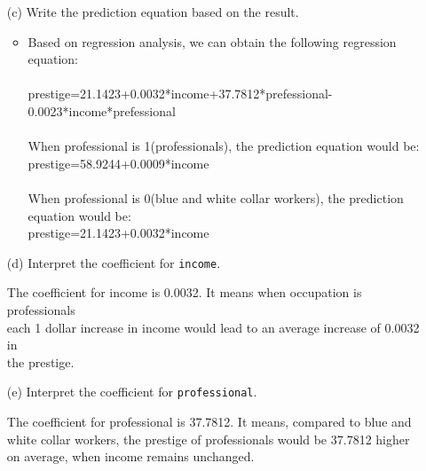 \documentclass[12pt,letterpaper]{article}
\begin{document}
\begin{enumerate}
	\vspace{6cm}
	\item [(c)]
	Write the prediction equation based on the result.
	\vspace{2cm}
			\begin{itemize}
		\item Based on regression analysis, we can obtain the following regression equation:\\
\\
prestige=21.1423+0.0032*income+37.7812*prefessional-0.0023*income*prefessional\\
\\
When professional is 1(professionals), the prediction equation would be:\\
prestige=58.9244+0.0009*income\\
\\
When professional is 0(blue and white collar workers), the prediction equation would be:\\
prestige=21.1423+0.0032*income\\
        	\end{itemize}
	
\newpage
	\item [(d)]
	Interpret the coefficient for \texttt{income}.
	\vspace{2cm}
    \begin{itemize}
The coefficient for income is 0.0032. It means when occupation is professionals \\
each 1 dollar increase in income would lead to an average increase of 0.0032  in\\
 the prestige.\\
   \end{itemize}
	\vspace{10cm}	
	\item [(e)]
	Interpret the coefficient for \texttt{professional}.
		\vspace{2cm}
	\begin{itemize}
		The coefficient for professional is 37.7812. It means, compared to blue and \\
		white collar workers, the prestige of professionals would be 37.7812 higher \\
		on average, when income remains unchanged.\\
	\end{itemize}
	\newpage
	

\end{enumerate}
\end{document}
